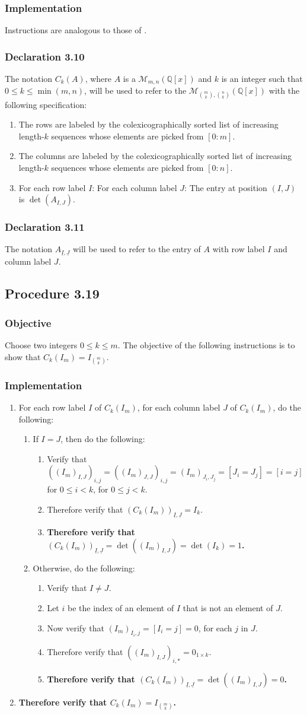 \documentclass[twocolumn]{article}
\newcommand{\ul}[1]{\underline{#1}}
\newcommand{\declaration}[1]{\subsubsection*{Declaration #1}\label{sec:declaration #1}}
\newcommand{\procedure}[2][]{\subsection*{Procedure #2 \ifthenelse{\equal{#1}{}}{}{(#1)}}\label{sec:procedure #2}}
\newcommand{\objective}{\subsubsection*{Objective}}
\newcommand{\implementation}{\subsubsection*{Implementation}}
\newcommand{\procedurehr}[2][]{\hyperref[sec:procedure #2]{\ifthenelse{\equal{#1}{}}{procedure #2}{#1}}}
\begin{document}
			\implementation
				Instructions are analogous to those of \procedurehr{3.17}.
		\declaration{3.10}
			The notation $C_k(A)$, where $A$ is a $\mathcal{M}_{m,n}(\mathbb{Q}[x])$ and $k$ is an integer such that $0\le k\le\min(m,n)$, will be used to refer to the $\mathcal{M}_{\binom{m}{k},\binom{n}{k}}(\mathbb{Q}[x])$ with the following specification:
			\begin{enumerate}
				\item The rows are labeled by the colexicographically sorted list of increasing length-$k$ sequences whose elements are picked from $[0:m]$.
				\item The columns are labeled by the colexicographically sorted list of increasing length-$k$ sequences whose elements are picked from $[0:n]$.
				\item For each row label $I$: For each column label $J$: The entry at position $(I,J)$ is $\det(A_{I,J})$.
			\end{enumerate}
		\declaration{3.11}
			The notation $A_{\ul{I},\ul{J}}$ will be used to refer to the entry of $A$ with row label $I$ and column label $J$.
		\procedure{3.19}
			\objective
				Choose two integers $0\le k\le m$. The objective of the following instructions is to show that $C_k(I_m)=I_{\binom{m}{k}}$.
			\implementation
				\begin{enumerate}
					\item For each row label $I$ of $C_k(I_m)$, for each column label $J$ of $C_k(I_m)$, do the following:
					\begin{enumerate}
						\item If $I=J$, then do the following:
						\begin{enumerate}
							\item Verify that $((I_m)_{I,J})_{i,j}=((I_m)_{J,J})_{i,j}=(I_m)_{J_i,J_j}=[J_i=J_j]=[i=j]$ for $0\le i<k$, for $0\le j<k$.
							\item Therefore verify that $(C_k(I_m))_{\ul{I},\ul{J}}=I_k$.
							\item \textbf{Therefore verify that $(C_k(I_m))_{\ul{I},\ul{J}}=\det((I_m)_{I,J})=\det(I_k)=1$.}
						\end{enumerate}
						\item Otherwise, do the following:
						\begin{enumerate}
							\item Verify that $I\ne J$.
							\item Let $i$ be the index of an element of $I$ that is not an element of $J$.
							\item Now verify that $(I_m)_{I_i,j}=[I_i=j]=0$, for each $j$ in $J$.
							\item Therefore verify that $((I_m)_{I,J})_{i,*}=0_{1\times k}$.
							\item \textbf{Therefore verify that $(C_k(I_m))_{\ul{I},\ul{J}}=\det((I_m)_{I,J})=0$.}
						\end{enumerate}
					\end{enumerate}
					\item \textbf{Therefore verify that $C_k(I_m)=I_{\binom{m}{k}}$.}	
				\end{enumerate}
\end{document}
